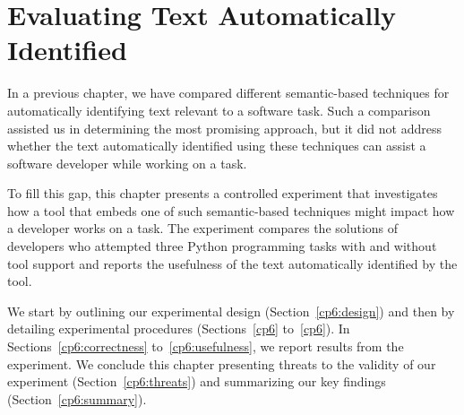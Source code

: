 \setcounter{chapter}{5}
\setcounter{rq}{1}


\chapter{Evaluating Text Automatically Identified}
\label{ch:assisting}




In a previous chapter, we have compared different semantic-based techniques for automatically identifying text relevant to a software task.
Such a comparison assisted us in determining the most promising approach, but it did not address whether 
the text automatically identified  
using these techniques can assist a software developer while working on a task.



To fill this gap, this chapter presents a controlled experiment that 
investigates how a tool that embeds one of such semantic-based techniques 
might impact how a developer works on a task. 
The experiment 
compares the solutions of developers who attempted three Python programming tasks with and without tool support
and reports the usefulness of the text automatically identified by the tool.





We start by outlining our experimental design (Section~\ref{cp6:design}) and then 
by detailing experimental procedures (Sections~\ref{cp6} to~\ref{cp6}).
In Sections~\ref{cp6:correctness} to~\ref{cp6:usefulness}, we report results from the experiment.
We conclude this chapter presenting threats to the validity of our experiment (Section~\ref{cp6:threats}) and 
 summarizing our key findings (Section~\ref{cp6:summary}).


\clearpage










